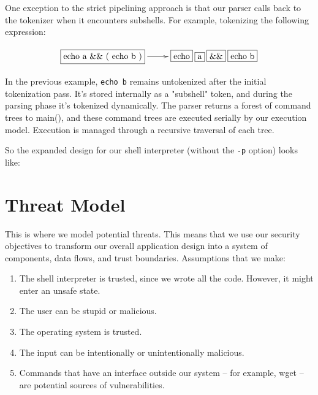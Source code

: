 \documentclass[12pt]{article}
\begin{document}
One exception to the strict pipelining approach is that our parser calls back to the tokenizer when it encounters subshells. For example, tokenizing the following expression:

\begin{displaymath}
\xymatrix{
\framebox{echo a \&\& ( echo b )} \ar[r] & \framebox{echo} \: \framebox{a} \: \framebox{\&\&} \: \framebox{echo	 b}
}
\end{displaymath}

In the previous example, \texttt{echo b} remains untokenized after the initial tokenization pass. It's stored internally as a "subshell" token, and during the parsing phase it's tokenized dynamically. The parser returns a forest of command trees to main(), and these command trees are executed serially by our execution model. Execution is managed through a recursive traversal of each tree.

So the expanded design for our shell interpreter (without the \texttt{-p} option) looks like: \\


\section{Threat Model}
This is where we model potential threats. This means that we use our security objectives to transform our overall application design into a system of components, data flows, and trust boundaries. Assumptions that we make:

\begin{enumerate}
	\item The shell interpreter is trusted, since we wrote all the code. However, it might enter an unsafe state.
	\item The user can be stupid or malicious.
	\item The operating system is trusted.
	\item The input can be intentionally or unintentionally malicious.
	\item Commands that have an interface outside our system -- for example, wget -- are potential sources of vulnerabilities.
\end{enumerate}
\end{document}
